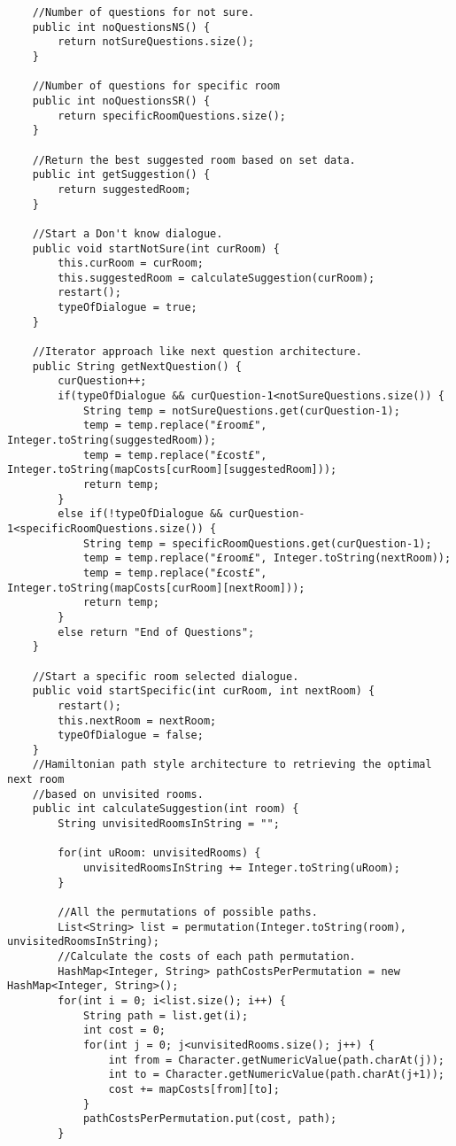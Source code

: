 \begin{lstlisting}
	//Number of questions for not sure.
	public int noQuestionsNS() {
		return notSureQuestions.size();
	}

	//Number of questions for specific room
	public int noQuestionsSR() {
		return specificRoomQuestions.size();
	}

	//Return the best suggested room based on set data.
	public int getSuggestion() {
		return suggestedRoom;
	}

	//Start a Don't know dialogue.
	public void startNotSure(int curRoom) {
		this.curRoom = curRoom;
		this.suggestedRoom = calculateSuggestion(curRoom);
		restart();
		typeOfDialogue = true;
	}

	//Iterator approach like next question architecture.
	public String getNextQuestion() {
		curQuestion++;
		if(typeOfDialogue && curQuestion-1<notSureQuestions.size()) {
			String temp = notSureQuestions.get(curQuestion-1);
			temp = temp.replace("£room£", Integer.toString(suggestedRoom));
			temp = temp.replace("£cost£", Integer.toString(mapCosts[curRoom][suggestedRoom]));
			return temp;
		}
		else if(!typeOfDialogue && curQuestion-1<specificRoomQuestions.size()) {
			String temp = specificRoomQuestions.get(curQuestion-1);
			temp = temp.replace("£room£", Integer.toString(nextRoom));
			temp = temp.replace("£cost£", Integer.toString(mapCosts[curRoom][nextRoom]));
			return temp;
		}
		else return "End of Questions";
	}

	//Start a specific room selected dialogue.
	public void startSpecific(int curRoom, int nextRoom) {
		restart();
		this.nextRoom = nextRoom;
		typeOfDialogue = false;
	}
	//Hamiltonian path style architecture to retrieving the optimal next room
	//based on unvisited rooms.
	public int calculateSuggestion(int room) {
		String unvisitedRoomsInString = "";
		
		for(int uRoom: unvisitedRooms) {
			unvisitedRoomsInString += Integer.toString(uRoom);
		}
		
		//All the permutations of possible paths.
		List<String> list = permutation(Integer.toString(room), unvisitedRoomsInString);
		//Calculate the costs of each path permutation.
		HashMap<Integer, String> pathCostsPerPermutation = new HashMap<Integer, String>();
		for(int i = 0; i<list.size(); i++) {
			String path = list.get(i);
			int cost = 0;
			for(int j = 0; j<unvisitedRooms.size(); j++) {
				int from = Character.getNumericValue(path.charAt(j));
				int to = Character.getNumericValue(path.charAt(j+1));
				cost += mapCosts[from][to];
			}
			pathCostsPerPermutation.put(cost, path);
		}


\end{lstlisting}
